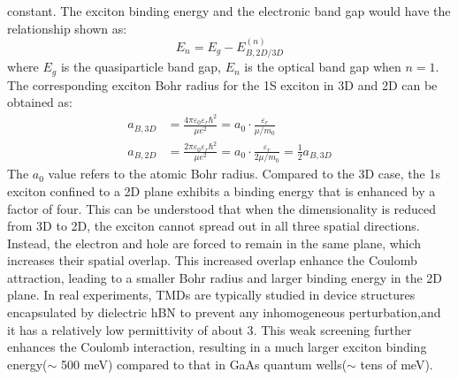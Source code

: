 constant. 
The exciton binding energy and the electronic band gap would have the relationship shown as:
\begin{equation}
E_n = E_g-E_{B,2D/3D}^{(n)}
\label{eq:optical gap}
\end{equation}\vspace{-0.5em}
where $E_g$ is the quasiparticle band gap, $E_n$ is the optical band gap when $n =1$. The corresponding exciton Bohr radius for the 1S exciton in 3D and 2D can be obtained as:
\begin{align}
a_{B,3D} &= \frac{4\pi \varepsilon_0 \varepsilon_r \hbar^2}{\mu e^2} 
           = a_0 \cdot \frac{\varepsilon_r}{\mu/m_0} \\[6pt]
a_{B,2D} &= \frac{2\pi \varepsilon_0 \varepsilon_r \hbar^2}{\mu e^2} 
           = a_0 \cdot \frac{\varepsilon_r}{2\mu/m_0} 
           = \frac{1}{2} a_{B,3D}
\label{eq:exciton_bohr_radius}
\end{align}
The $a_0$ value refers to the atomic Bohr radius. 
Compared to the 3D case, the 1s exciton confined to a 2D plane exhibits a binding energy that is enhanced by a factor of four.
This can be understood that when the dimensionality is reduced from 3D to 2D, the exciton cannot spread out in all three spatial directions.
Instead, the electron and hole are forced to remain in the same plane, which increases their spatial overlap. 
This increased overlap enhance the Coulomb attraction, leading to a smaller Bohr radius and larger binding energy in the 2D plane.
In real experiments, TMDs are typically studied in device structures encapsulated by dielectric hBN to prevent any inhomogeneous perturbation,and it has a relatively low permittivity of about 3\cite{Hunt2013-ma}.
This weak screening further enhances the Coulomb interaction, resulting in a much larger exciton binding energy($\sim$ 500 meV)\cite{Wang2018-my} compared to that in GaAs quantum wells($\sim$ tens of meV)\cite{Nakwaski1995-hc}.

